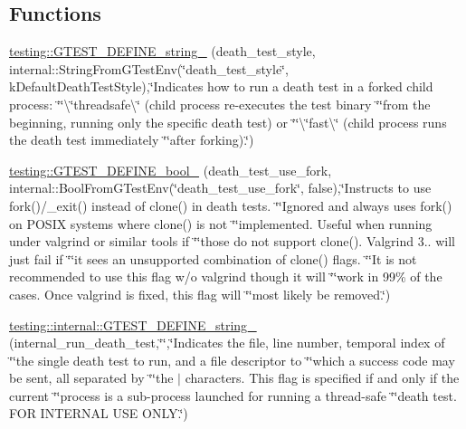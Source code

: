 \subsection*{Functions}
\begin{DoxyCompactItemize}
\item 
\hyperlink{namespacetesting_ad93c9ec89517d047ed323b79d96df251}{testing\+::\+G\+T\+E\+S\+T\+\_\+\+D\+E\+F\+I\+N\+E\+\_\+string\+\_\+} (death\+\_\+test\+\_\+style, internal\+::\+String\+From\+G\+Test\+Env(\char`\"{}death\+\_\+test\+\_\+style\char`\"{}, k\+Default\+Death\+Test\+Style),\char`\"{}Indicates how to run a death test in a forked child process\+: \char`\"{}\char`\"{}\textbackslash{}\char`\"{}threadsafe\textbackslash{}\char`\"{} (child process re-\/executes the test binary \char`\"{}\char`\"{}from the beginning, running only the specific death test) or \char`\"{}\char`\"{}\textbackslash{}\char`\"{}fast\textbackslash{}\char`\"{} (child process runs the death test immediately \char`\"{}\char`\"{}after forking).\char`\"{})
\item 
\hyperlink{namespacetesting_afee59458b05682d57d3a389e0903bc01}{testing\+::\+G\+T\+E\+S\+T\+\_\+\+D\+E\+F\+I\+N\+E\+\_\+bool\+\_\+} (death\+\_\+test\+\_\+use\+\_\+fork, internal\+::\+Bool\+From\+G\+Test\+Env(\char`\"{}death\+\_\+test\+\_\+use\+\_\+fork\char`\"{}, false),\char`\"{}Instructs to use fork()/\+\_\+exit() instead of clone() in death tests. \char`\"{}\char`\"{}Ignored and always uses fork() on P\+O\+S\+IX systems where clone() is not \char`\"{}\char`\"{}implemented. Useful when running under valgrind or similar tools if \char`\"{}\char`\"{}those do not support clone(). Valgrind 3.. will just fail if \char`\"{}\char`\"{}it sees an unsupported combination of clone() flags. \char`\"{}\char`\"{}It is not recommended to use this flag w/o valgrind though it will \char`\"{}\char`\"{}work in 99\% of the cases. Once valgrind is fixed, this flag will \char`\"{}\char`\"{}most likely be removed.\char`\"{})
\item 
\hyperlink{namespacetesting_1_1internal_a1b4d550272b7346726a5b4976d5c7aca}{testing\+::internal\+::\+G\+T\+E\+S\+T\+\_\+\+D\+E\+F\+I\+N\+E\+\_\+string\+\_\+} (internal\+\_\+run\+\_\+death\+\_\+test,\char`\"{}\char`\"{},\char`\"{}Indicates the file, line number, temporal index of \char`\"{}\char`\"{}the single death test to run, and a file descriptor to \char`\"{}\char`\"{}which a success code may be sent, all separated by \char`\"{}\char`\"{}the \textquotesingle{}$\vert$\textquotesingle{} characters.  This flag is specified if and only if the current \char`\"{}\char`\"{}process is a sub-\/process launched for running a thread-\/safe \char`\"{}\char`\"{}death test.  F\+OR I\+N\+T\+E\+R\+N\+AL U\+SE O\+N\+L\+Y.\char`\"{})
\end{DoxyCompactItemize}
